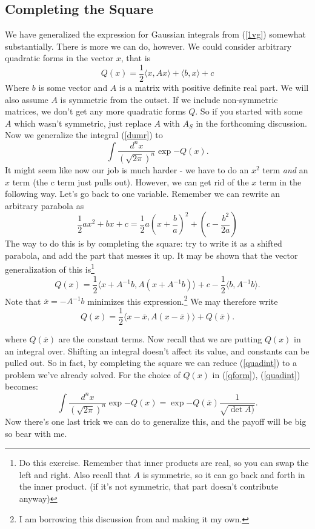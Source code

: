 \documentclass{book}
\begin{document}
\subsection{Completing the Square}
We have generalized the expression for Gaussian integrals from (\ref{1vg}) somewhat substantially. There is more we can do, however. We could consider arbitrary quadratic forms in the vector $x$, that is
\begin{equation} \label{qform}
Q(x) = \frac{1}{2} \langle x, A x \rangle + \langle b, x \rangle + c
\end{equation}
Where $b$ is some vector and $A$ is a matrix with positive definite real part. We will also assume $A$ is symmetric from the outset. If we include non-symmetric matrices, we don't get any more quadratic forms $Q$. So if you started with some $A$ which wasn't symmetric, just replace $A$ with $A_S$ in the forthcoming discussion. Now we generalize the integral (\ref{dumr}) to
\begin{equation} \label{quadint}
\int \frac{d^n x}{(\sqrt{2\pi})^n} \exp{-Q(x)}.
\end{equation}
It might seem like now our job is much harder - we have to do an $x^2$ term \textit{and} an $x$ term (the c term just pulls out). However, we can get rid of the $x$ term in the following way. Let's go back to one variable. Remember we can rewrite an arbitrary parabola as
\begin{equation} \label{grade8}
\frac{1}{2} a x^2 + bx + c = \frac{1}{2} a\left( x + \frac{b}{a} \right)^2 + \left( c - \frac{b^2}{2a} \right)
\end{equation}
The way to do this is by completing the square: try to write it as a shifted parabola, and add the part that messes it up. It may be shown that the vector generalization of this is\footnote{Do this exercise. Remember that inner products are real, so you can swap the left and right. Also recall that $A$ is symmetric, so it can go back and forth in the inner product. (if it's not symmetric, that part doesn't contribute anyway)}
\[
Q(x) = \frac{1}{2} \langle x + A^{-1}b, A \left( x + A^{-1}b\right) \rangle + c - \frac{1}{2}\langle b, A^{-1} b \rangle.
\]
Note that $\overline{x} = -A^{-1} b$ minimizes this expression.\footnote{I am borrowing this discussion from \cite{Co1} and making it my own.} We may therefore write
\[
Q(x) = \frac{1}{2} \langle x - \overline{x}, A(x - \overline{x}) \rangle + Q(\overline{x}).
\]

where $Q(\overline{x})$ are the constant terms. Now recall that we are putting $Q(x)$ in an integral over. Shifting an integral doesn't affect its value, and constants can be pulled out. So in fact, by completing the square we can reduce (\ref{quadint}) to a problem we've already solved. For the choice of $Q(x)$ in (\ref{qform}), (\ref{quadint}) becomes:
\begin{equation} \label{cts}
\int \frac{d^n x}{(\sqrt{2\pi})^n} \exp{-Q(x)} = \exp{-Q(\overline{x})} \frac{1}{\sqrt{\det A)}}.
\end{equation}
Now there's one last trick we can do to generalize this, and the payoff will be big so bear with me. 
\end{document}
